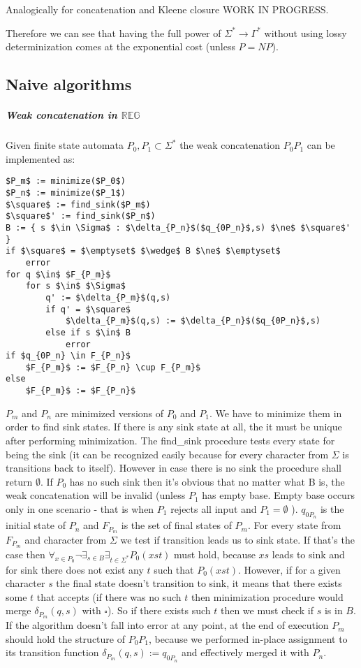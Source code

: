 \documentclass[12pt]{article}
\begin{document}
Analogically for concatenation and Kleene closure WORK IN PROGRESS.

Therefore we can see that having the full power of $\Sigma^* \rightarrow \Gamma^*$ without using lossy determinization comes at the exponential cost (unless $P=NP$).







\subsection{Naive algorithms}
\subparagraph{Weak concatenation in $\mathbb{REG}$}
Given finite state automata $P_0,P_1 \subset \Sigma^*$ the weak concatenation $P_0P_1 $ can be implemented as:
\begin{lstlisting}
$P_m$ := minimize($P_0$)
$P_n$ := minimize($P_1$)
$\square$ := find_sink($P_m$)
$\square$' := find_sink($P_n$)
B := { s $\in \Sigma$ : $\delta_{P_n}$($q_{0P_n}$,s) $\ne$ $\square$' }
if $\square$ = $\emptyset$ $\wedge$ B $\ne$ $\emptyset$
    error
for q $\in$ $F_{P_m}$ 
    for s $\in$ $\Sigma$
        q' := $\delta_{P_m}$(q,s)
        if q' = $\square$ 
            $\delta_{P_m}$(q,s) := $\delta_{P_n}$($q_{0P_n}$,s) 
        else if s $\in$ B
            error
if $q_{0P_n} \in F_{P_n}$            
    $F_{P_m}$ := $F_{P_n} \cup F_{P_m}$
else 
    $F_{P_m}$ := $F_{P_n}$
\end{lstlisting}
$P_m$ and $P_n$ are minimized versions of $P_0$ and $P_1$. We have to minimize them in order to find sink states.  If there is any sink state at all, the it must be unique after performing minimization. The find\_sink procedure tests every state for being the sink (it can be recognized easily because for every character from $\Sigma$ is transitions back to itself). However in case there is no sink the procedure shall return $\emptyset$. If $P_0$ has no such sink then it's obvious that no matter what B is, the weak concatenation will be invalid (unless  $P_1$ has empty base. Empty base occurs only in one scenario - that is when $P_1$ rejects all input and $P_1 = \emptyset$ ). $q_{0P_n}$ is the initial state of $P_n$ and $F_{P_m}$ is the set of final states of $P_m$. For every state from $F_{P_m}$ and character from $\Sigma$ we test if transition leads us to sink state. If that's the case then $\forall_{x\in P_0} \neg \exists_{s\in B} \exists_{t\in\Sigma^*} P_0(xst)$ must hold, because $xs$ leads to sink and for sink there does not exist any $t$ such that $ P_0(xst)$. However, if for a given  character $s$ the final state doesn't transition to sink, it means that there exists some $t$ that accepts (if there was no such $t$ then minimization procedure would merge $\delta_{P_m}(q,s)$ with $\square$). So if there exists such $t$ then we must check if $s$ is in $B$. If the algorithm doesn't fall into error at any point, at the end of execution $P_m$ should hold the structure of $P_0P_1$, because we performed in-place assignment to its transition function $\delta_{P_m}(q,s) := q_{0P_n}$ and effectively merged it with $P_n$.
\end{document}
